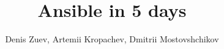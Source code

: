 \documentclass{book}
\begin{document}
\title{Ansible in 5 days}
\author{Denis Zuev, Artemii Kropachev, Dmitrii Mostovshchikov}
\maketitle





\end{document}

